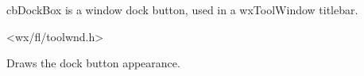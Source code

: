 %
%


\section{}\label{cbdockbox}


cbDockBox is a window dock button, used in a wxToolWindow titlebar.




<wx/fl/toolwnd.h>




\label{cbdockboxdraw}


Draws the dock button appearance.

